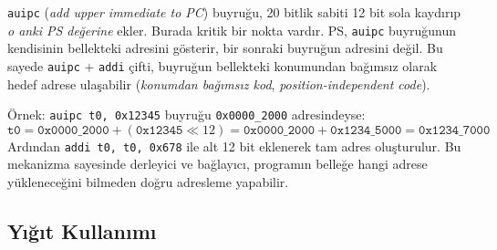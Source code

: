 \begin{bilginot}
\texttt{auipc} (\emph{add upper immediate to PC}) buyruğu, 20 bitlik sabiti 12 bit sola kaydırıp \emph{o anki PS değerine} ekler. Burada kritik bir nokta vardır. PS, \texttt{auipc} buyruğunun kendisinin bellekteki adresini gösterir, bir sonraki buyruğun adresini değil. Bu sayede \texttt{auipc} + \texttt{addi} çifti, buyruğun bellekteki konumundan bağımsız olarak hedef adrese ulaşabilir (\emph{konumdan bağımsız kod}, \emph{position-independent code}).

Örnek: \texttt{auipc t0, 0x12345} buyruğu \texttt{0x0000\_2000} adresindeyse:
\[
\texttt{t0} = \texttt{0x0000\_2000} + (\texttt{0x12345} \ll 12) = \texttt{0x0000\_2000} + \texttt{0x1234\_5000} = \texttt{0x1234\_7000}
\]
Ardından \texttt{addi t0, t0, 0x678} ile alt 12 bit eklenerek tam adres oluşturulur. Bu mekanizma sayesinde derleyici ve bağlayıcı, programın belleğe hangi adrese yükleneceğini bilmeden doğru adresleme yapabilir.
\end{bilginot}

\subsection{Yığıt Kullanımı}
\label{subsec:yigit-kullanimi}

